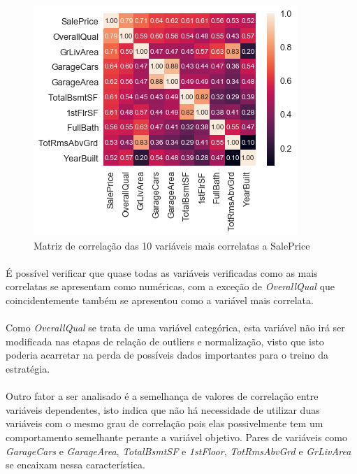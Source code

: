 \documentclass{article}
\begin{document}
			\begin{figure}[h]
				\centering
				\includegraphics[scale=0.9]{../img/correlation}
				\caption{Matriz de correlação das 10 variáveis mais correlatas a SalePrice}
			\end{figure}
			
			\paragraph{}É possível verificar que quase todas as variáveis verificadas como as mais correlatas se apresentam como numéricas, com a exceção de \textit{OverallQual} que coincidentemente também se apresentou como a variável mais correlata.
			
			\paragraph{}Como \textit{OverallQual} se trata de uma variável categórica, esta variável não irá ser modificada nas etapas de relação de outliers e normalização, visto que isto poderia acarretar na perda de possíveis dados importantes para o treino da estratégia.
			
			\paragraph{}Outro fator a ser analisado é a semelhança de valores de correlação entre variáveis dependentes, isto indica que não há necessidade de utilizar duas variáveis com o mesmo grau de correlação pois elas possivelmente tem um comportamento semelhante perante a variável objetivo. Pares de variáveis como \textit{GarageCars} e \textit{GarageArea}, \textit{TotalBsmtSF} e \textit{1stFloor}, \textit{TotRmsAbvGrd} e \textit{GrLivArea} se encaixam nessa característica.
			
\end{document}
